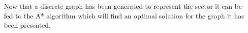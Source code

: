 Now that a discrete graph has been generated to represent the sector it can be fed to the A* algorithm which will find an optimal solution for the graph it has been presented.

